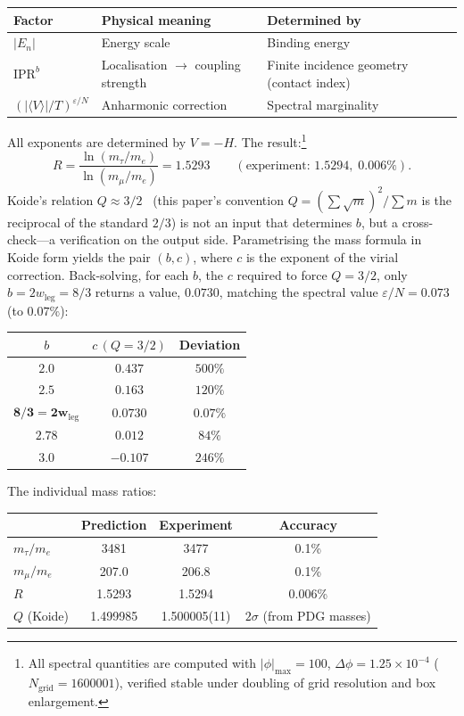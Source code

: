 \documentclass[12pt,a4paper]{article}
\begin{document}
\begin{center}\small
\begin{tabular}{lll}
\toprule
Factor & Physical meaning & Determined by \\
\midrule
$|E_n|$ & Energy scale & Binding energy \\
$\mathrm{IPR}^{b}$ & Localisation $\to$ coupling strength & Finite incidence geometry (contact index) \\
$(|\langle V \rangle|/T)^{\varepsilon/N}$ & Anharmonic correction & Spectral marginality \\
\bottomrule
\end{tabular}
\end{center}

\noindent
All exponents are determined by $V = -H$.
The result:\footnote{All spectral quantities are computed with
$|\phi|_\mathrm{max} = 100$, $\Delta\phi = 1.25\times 10^{-4}$
($N_\mathrm{grid} = 1600001$), verified stable under
doubling of grid resolution and box enlargement.}
\begin{equation}
  R = \frac{\ln(m_\tau/m_e)}{\ln(m_\mu/m_e)} = 1.5293
  \qquad (\text{experiment: } 1.5294,\; 0.006\%).
\end{equation}
Koide's relation $Q \approx 3/2$~\cite{koide} (this paper's convention $Q = (\sum\sqrt{m})^2/\sum m$ is the reciprocal of the standard $2/3$) is not an input that determines $b$, but a cross-check---a verification on the output side. Parametrising the mass formula in Koide form yields the pair $(b, c)$, where $c$ is the exponent of the virial correction. Back-solving, for each $b$, the $c$ required to force $Q = 3/2$, only $b = 2w_\mathrm{leg} = 8/3$ returns a value, $0.0730$, matching the spectral value $\varepsilon/N = 0.073$ (to $0.07\%$):
  \begin{center}\small
  \begin{tabular}{ccc}
  \toprule
  $b$ & $c\,(Q{=}3/2)$ & Deviation \\
  \midrule
  $2.0$ & $0.437$ & $500\%$ \\
  $2.5$ & $0.163$ & $120\%$ \\
  $\mathbf{8/3 = 2w_\mathrm{leg}}$ & $\mathbf{0.0730}$ & $\mathbf{0.07\%}$ \\
  $2.78$ & $0.012$ & $84\%$ \\
  $3.0$ & $-0.107$ & $246\%$ \\
  \bottomrule
  \end{tabular}
  \end{center}

\noindent
The individual mass ratios:
\begin{center}\small
\begin{tabular}{lccc}
\toprule
 & Prediction & Experiment & Accuracy \\
\midrule
$m_\tau/m_e$ & 3481 & 3477 & 0.1\% \\
$m_\mu/m_e$ & 207.0 & 206.8 & 0.1\% \\
$R$          & 1.5293 & 1.5294 & 0.006\% \\
$Q$ (Koide)  & 1.499985 & 1.500005(11) & $2\sigma$ (from PDG masses) \\
\bottomrule
\end{tabular}
\end{center}
\end{document}
